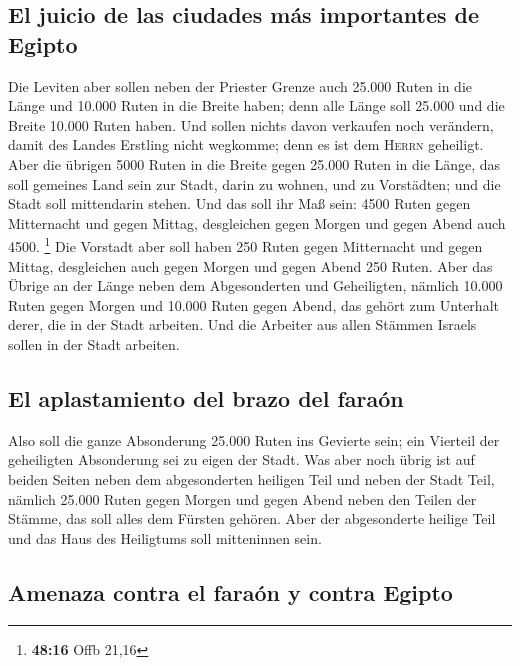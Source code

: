 \hypertarget{el-juicio-de-las-ciudades-muxe1s-importantes-de-egipto}{%
\subsection{El juicio de las ciudades más importantes de
Egipto}\label{el-juicio-de-las-ciudades-muxe1s-importantes-de-egipto}}

 Die Leviten aber sollen neben der Priester Grenze auch
25.000 Ruten in die Länge und 10.000 Ruten in die Breite haben; denn
alle Länge soll 25.000 und die Breite 10.000 Ruten haben.
 Und sollen nichts davon verkaufen noch verändern, damit
des Landes Erstling nicht wegkomme; denn es ist dem \textsc{Herrn}
geheiligt.  Aber die übrigen 5000 Ruten in die Breite
gegen 25.000 Ruten in die Länge, das soll gemeines Land sein zur Stadt,
darin zu wohnen, und zu Vorstädten; und die Stadt soll mittendarin
stehen.  Und das soll ihr Maß sein: 4500 Ruten gegen
Mitternacht und gegen Mittag, desgleichen gegen Morgen und gegen Abend
auch 4500. \footnote{\textbf{48:16} Offb 21,16}  Die
Vorstadt aber soll haben 250 Ruten gegen Mitternacht und gegen Mittag,
desgleichen auch gegen Morgen und gegen Abend 250 Ruten. 
Aber das Übrige an der Länge neben dem Abgesonderten und Geheiligten,
nämlich 10.000 Ruten gegen Morgen und 10.000 Ruten gegen Abend, das
gehört zum Unterhalt derer, die in der Stadt arbeiten. 
Und die Arbeiter aus allen Stämmen Israels sollen in der Stadt arbeiten.

\hypertarget{el-aplastamiento-del-brazo-del-farauxf3n}{%
\subsection{El aplastamiento del brazo del
faraón}\label{el-aplastamiento-del-brazo-del-farauxf3n}}

 Also soll die ganze Absonderung 25.000 Ruten ins
Gevierte sein; ein Vierteil der geheiligten Absonderung sei zu eigen der
Stadt.  Was aber noch übrig ist auf beiden Seiten neben
dem abgesonderten heiligen Teil und neben der Stadt Teil, nämlich 25.000
Ruten gegen Morgen und gegen Abend neben den Teilen der Stämme, das soll
alles dem Fürsten gehören. Aber der abgesonderte heilige Teil und das
Haus des Heiligtums soll mitteninnen sein.

\hypertarget{amenaza-contra-el-farauxf3n-y-contra-egipto}{%
\subsection{Amenaza contra el faraón y contra
Egipto}\label{amenaza-contra-el-farauxf3n-y-contra-egipto}}

